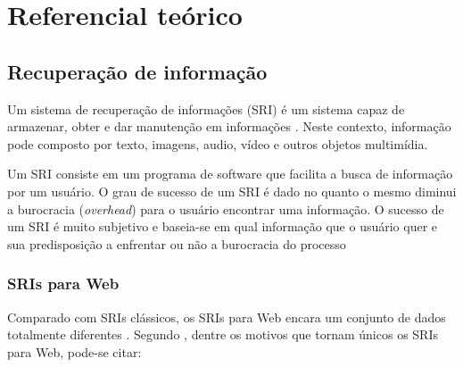 
\pagebreak
\chapter{Referencial teórico}

\section{Recuperação de informação}

Um sistema de recuperação de informações (SRI) é um sistema capaz de armazenar, obter e dar manutenção em informações \cite[p. 2]{kowalski}. Neste contexto, informação pode composto por texto, imagens, audio, vídeo e outros objetos multimídia.

Um SRI consiste em um programa de software que facilita a busca de informação por um usuário. O grau de sucesso de um SRI é dado no quanto o mesmo diminui a burocracia (\emph{overhead}) para o usuário encontrar uma informação. O sucesso de um SRI é muito subjetivo e baseia-se em qual informação que o usuário quer e sua predisposição a enfrentar ou não a burocracia do processo \cite[p. 4]{kowalski}

\subsection{SRIs para Web}

Comparado com SRIs clássicos, os SRIs para Web encara um conjunto de dados totalmente diferentes \cite[p. 2]{surveyir}. Segundo \cite{surveyir}, dentre os motivos que tornam únicos os SRIs para Web, pode-se citar:

